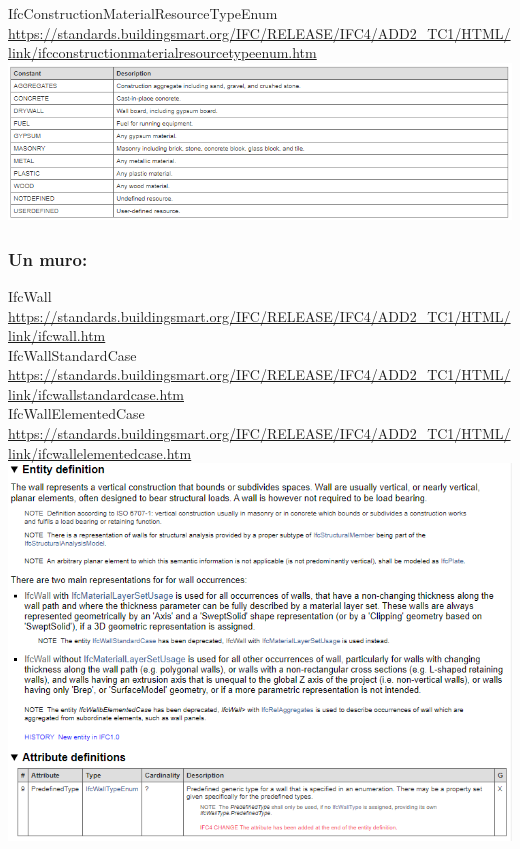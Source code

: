 \documentclass[spanish,12pt,a4paper,final,oneside]{book}
\begin{document}
IfcConstructionMaterialResourceTypeEnum
\\ \url{https://standards.buildingsmart.org/IFC/RELEASE/IFC4/ADD2_TC1/HTML/link/ifcconstructionmaterialresourcetypeenum.htm}
\\ \includegraphics[width=\textwidth]{Definicion de IfcConstructionMaterialResourceTypeEnum}

\subsubsection{Un muro:}
IfcWall
\\ \url{https://standards.buildingsmart.org/IFC/RELEASE/IFC4/ADD2_TC1/HTML/link/ifcwall.htm}
\\IfcWallStandardCase
\\ \url{https://standards.buildingsmart.org/IFC/RELEASE/IFC4/ADD2_TC1/HTML/link/ifcwallstandardcase.htm}
\\IfcWallElementedCase
\\ \url{https://standards.buildingsmart.org/IFC/RELEASE/IFC4/ADD2_TC1/HTML/link/ifcwallelementedcase.htm}
\\ \includegraphics[width=\textwidth]{Definicion de IfcWall}
\end{document}
